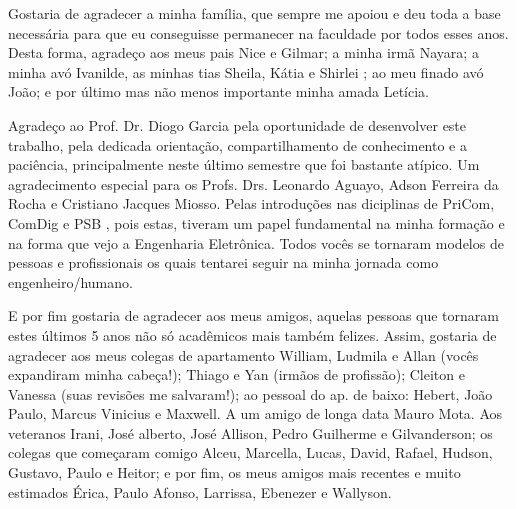 \begin{agradecimentos}
Gostaria de agradecer a minha família, que sempre me apoiou e deu toda a base necessária para que eu conseguisse permanecer na faculdade por todos esses anos. Desta forma, agradeço aos meus pais Nice  e Gilmar; a minha irmã Nayara; a minha avó Ivanilde, as  minhas tias Sheila, Kátia e Shirlei ; ao meu finado avó João; e por último mas não menos importante minha amada Letícia.

Agradeço ao Prof. Dr. Diogo Garcia pela oportunidade de desenvolver este trabalho, pela dedicada orientação, compartilhamento de conhecimento e a paciência, principalmente neste último semestre que foi bastante atípico. Um agradecimento especial para os Profs. Drs. Leonardo Aguayo, Adson Ferreira da Rocha e Cristiano Jacques Miosso. Pelas introduções nas diciplinas de PriCom, ComDig e PSB , pois estas, tiveram um papel fundamental na minha formação e na forma que vejo a Engenharia Eletrônica. Todos vocês se tornaram modelos de pessoas e profissionais os quais tentarei seguir na minha jornada como  engenheiro/humano.

E por fim gostaria de agradecer aos meus amigos, aquelas pessoas que tornaram estes últimos 5 anos não só acadêmicos mais também felizes. Assim, gostaria de agradecer aos meus colegas de  apartamento William, Ludmila e Allan (vocês expandiram minha cabeça!); Thiago e Yan (irmãos de profissão); Cleiton e Vanessa (suas revisões me salvaram!); ao pessoal do ap. de baixo: Hebert, João Paulo, Marcus Vinicius e Maxwell.  A um amigo de longa data Mauro Mota. Aos veteranos Irani, José alberto, José Allison, Pedro Guilherme e Gilvanderson; os colegas que começaram comigo  Alceu, Marcella, Lucas, David, Rafael, Hudson, Gustavo, Paulo e Heitor; e por fim, os meus amigos mais recentes e muito estimados Érica, Paulo Afonso, Larrissa, Ebenezer e Wallyson.
\end{agradecimentos}
